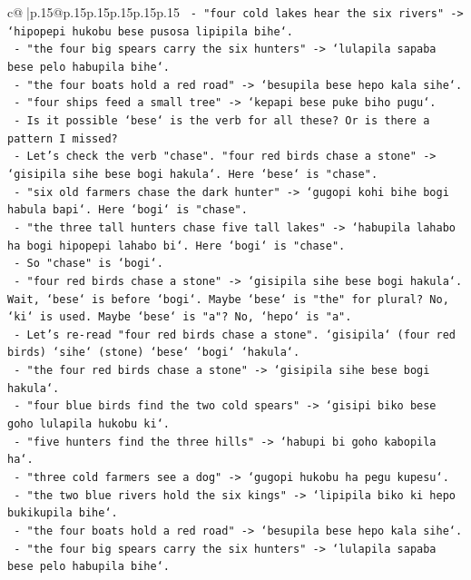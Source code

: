 \documentclass{article}
\begin{document}
{\begin{supertabular}{c@{$\;$}|p{.15\linewidth}@{}p{.15\linewidth}p{.15\linewidth}p{.15\linewidth}p{.15\linewidth}p{.15\linewidth}}
{{{\texttt{  {-} "four cold lakes hear the six rivers" {-}> `hipopepi hukobu bese pusosa lipipila bihe`.} \\
\texttt{  {-} "the four big spears carry the six hunters" {-}> `lulapila sapaba bese pelo habupila bihe`.} \\
\texttt{  {-} "the four boats hold a red road" {-}> `besupila bese hepo kala sihe`.} \\
\texttt{  {-} "four ships feed a small tree" {-}> `kepapi bese puke biho pugu`.} \\
\texttt{  {-} Is it possible `bese` is the verb for all these? Or is there a pattern I missed?} \\
\texttt{  {-} Let's check the verb "chase". "four red birds chase a stone" {-}> `gisipila sihe bese bogi hakula`. Here `bese` is "chase".} \\
\texttt{  {-} "six old farmers chase the dark hunter" {-}> `gugopi kohi bihe bogi habula bapi`. Here `bogi` is "chase".} \\
\texttt{  {-} "the three tall hunters chase five tall lakes" {-}> `habupila lahabo ha bogi hipopepi lahabo bi`. Here `bogi` is "chase".} \\
\texttt{  {-} So "chase" is `bogi`.} \\
\texttt{  {-} "four red birds chase a stone" {-}> `gisipila sihe bese bogi hakula`. Wait, `bese` is before `bogi`. Maybe `bese` is "the" for plural? No, `ki` is used. Maybe `bese` is "a"? No, `hepo` is "a".} \\
\texttt{  {-} Let's re{-}read "four red birds chase a stone". `gisipila` (four red birds) `sihe` (stone) `bese` `bogi` `hakula`.} \\
\texttt{  {-} "the four red birds chase a stone" {-}> `gisipila sihe bese bogi hakula`.} \\
\texttt{  {-} "four blue birds find the two cold spears" {-}> `gisipi biko bese goho lulapila hukobu ki`.} \\
\texttt{  {-} "five hunters find the three hills" {-}> `habupi bi goho kabopila ha`.} \\
\texttt{  {-} "three cold farmers see a dog" {-}> `gugopi hukobu ha pegu kupesu`.} \\
\texttt{  {-} "the two blue rivers hold the six kings" {-}> `lipipila biko ki hepo bukikupila bihe`.} \\
\texttt{  {-} "the four boats hold a red road" {-}> `besupila bese hepo kala sihe`.} \\
\texttt{  {-} "the four big spears carry the six hunters" {-}> `lulapila sapaba bese pelo habupila bihe`.} \\
}}}
\end{supertabular}}
\end{document}
